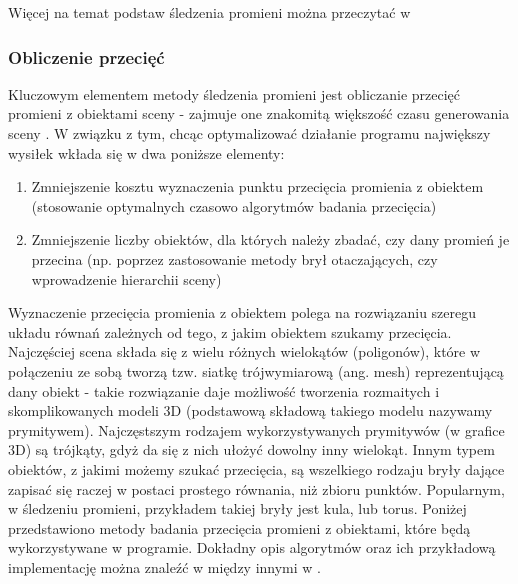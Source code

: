 Więcej na temat podstaw śledzenia promieni można przeczytać w \cite{foley95, suffern2007, scratch}

\subsubsection{Obliczenie przecięć}

Kluczowym elementem metody śledzenia promieni jest obliczanie przecięć promieni z obiektami sceny - zajmuje one znakomitą większość czasu generowania sceny \cite{suffern2007}. W związku z tym, chcąc optymalizować działanie programu największy wysiłek wkłada się w dwa poniższe elementy:

\begin{enumerate}

\item Zmniejszenie kosztu wyznaczenia punktu przecięcia promienia z obiektem (stosowanie optymalnych czasowo algorytmów badania przecięcia)

\item Zmniejszenie liczby obiektów, dla których należy zbadać, czy dany promień je przecina (np. poprzez zastosowanie metody brył otaczających, czy wprowadzenie hierarchii sceny)

\end{enumerate}

Wyznaczenie przecięcia promienia z obiektem polega na rozwiązaniu szeregu układu równań zależnych od tego, z jakim obiektem szukamy przecięcia. Najczęściej scena składa się z wielu różnych wielokątów (poligonów), które w połączeniu ze sobą tworzą tzw. siatkę trójwymiarową (ang. mesh) reprezentującą dany obiekt - takie rozwiązanie daje możliwość tworzenia rozmaitych i skomplikowanych modeli 3D (podstawową składową takiego modelu nazywamy prymitywem). Najczęstszym rodzajem wykorzystywanych prymitywów (w grafice 3D) są trójkąty, gdyż da się z nich ułożyć dowolny inny wielokąt. Innym typem obiektów, z jakimi możemy szukać przecięcia, są wszelkiego rodzaju bryły dające zapisać się raczej w postaci prostego równania, niż zbioru punktów. Popularnym, w śledzeniu promieni, przykładem takiej bryły jest kula, lub torus. Poniżej przedstawiono metody badania przecięcia promieni z obiektami, które będą wykorzystywane w programie. Dokładny opis algorytmów oraz ich przykładową implementację można znaleźć w między innymi w \cite{dunn02, scratch}.

